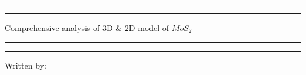 \documentclass[twoside,onecolumn]{article}
\date{\today} %
\begin{document}

\begin{titlepage} %

	\centering %
	
	\scshape %
	
	\vspace*{\baselineskip} %
	
	\rule{\textwidth}{1.6pt}\vspace*{-\baselineskip}\vspace*{2pt} %
	
	\rule{\textwidth}{0.4pt} %
	
	\vspace{0.75\baselineskip} %
	
	{\Large{Comprehensive analysis of 3D $\&$ 2D model of $MoS_2$}
	} %
	
	\vspace{0.75\baselineskip} %
	
	\rule{\textwidth}{0.4pt}\vspace*{-\baselineskip}\vspace{3.2pt} %
	
	\rule{\textwidth}{1.6pt} %
	
	\vspace{2\baselineskip} %
	
	
	
	\vspace*{3\baselineskip} %
	
       \large Written by:	
       

\end{titlepage}
\end{document}
